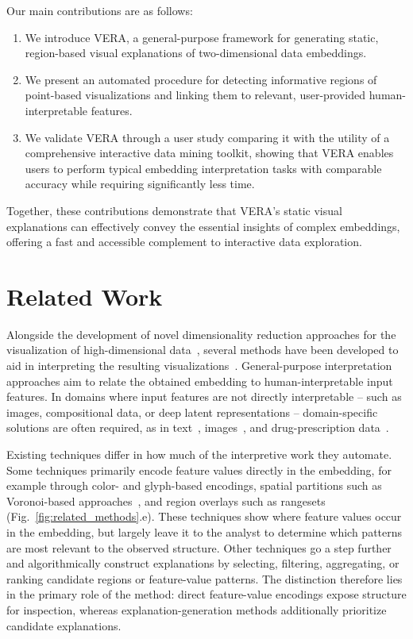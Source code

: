 \documentclass[lettersize,journal]{IEEEtran}
\begin{document}
Our main contributions are as follows:
\begin{enumerate}
  \item We introduce VERA, a general-purpose framework for generating static, region-based visual explanations of two-dimensional data embeddings.
  \item We present an automated procedure for detecting informative regions of point-based visualizations and linking them to relevant, user-provided human-interpretable features.
  \item We validate VERA through a user study comparing it with the utility of a comprehensive interactive data mining toolkit, showing that VERA enables users to perform typical embedding interpretation tasks with comparable accuracy while requiring significantly less time.
\end{enumerate}

Together, these contributions demonstrate that VERA's static visual explanations can effectively convey the essential insights of complex embeddings, offering a fast and accessible complement to interactive data exploration.

\section{Related Work}
\label{sec:related_work}

Alongside the development of novel dimensionality reduction approaches for the visualization of high-dimensional data~\cite{Kruskal1978,Maaten2008,McInnes2018}, several methods have been developed to aid in interpreting the resulting visualizations~\cite{ChengMueller2016,Marcilio2021,Fujiwara2020}.
General-purpose interpretation approaches aim to relate the obtained embedding to human-interpretable input features.
In domains where input features are not directly interpretable -- such as images, compositional data, or deep latent representations -- domain-specific solutions are often required, as in text~\cite{Heimerl2016,WangHohmanChau2023}, images~\cite{Liu2019,Ye2024}, and drug-prescription data~\cite{Policar2023}.

Existing techniques differ in how much of the interpretive work they automate.
Some techniques primarily encode feature values directly in the embedding, for example through color- and glyph-based encodings, spatial partitions such as Voronoi-based approaches~\cite{Broeksema2013}, and region overlays such as rangesets~\cite{Sohns2022} (Fig.~\ref{fig:related_methods}.e). These techniques show where feature values occur in the embedding, but largely leave it to the analyst to determine which patterns are most relevant to the observed structure.
Other techniques go a step further and algorithmically construct explanations by selecting, filtering, aggregating, or ranking candidate regions or feature-value patterns.
The distinction therefore lies in the primary role of the method: direct feature-value encodings expose structure for inspection, whereas explanation-generation methods additionally prioritize candidate explanations.
\end{document}
